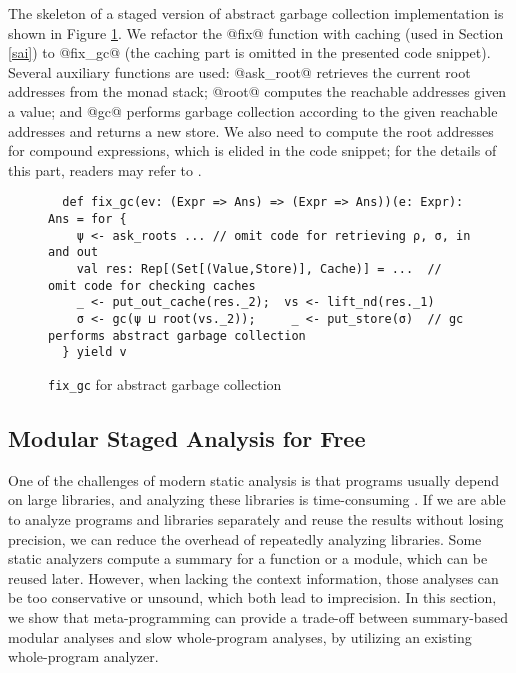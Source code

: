 The skeleton of a staged version of abstract garbage collection implementation
is shown in Figure \ref{fixgc}.
We refactor the @fix@ function with caching (used in Section \ref{sai}) to @fix_gc@
(the caching part is omitted in the presented code snippet). Several auxiliary
functions are used: @ask_root@ retrieves the current root addresses from the
monad stack; @root@ computes the reachable addresses given a value; and @gc@
performs garbage collection according to the given reachable addresses and
returns a new store. We also need to compute the root addresses for compound
expressions, which is elided in the code snippet; for the details of this part,
readers may refer to \cite{DBLP:journals/pacmpl/DaraisLNH17}.

\begin{figure}[h!]
\vspace{-1em}
\begin{lstlisting}
  def fix_gc(ev: (Expr => Ans) => (Expr => Ans))(e: Expr): Ans = for {
    ψ <- ask_roots ... // omit code for retrieving ρ, σ, in and out
    val res: Rep[(Set[(Value,Store)], Cache)] = ...  // omit code for checking caches
    _ <- put_out_cache(res._2);  vs <- lift_nd(res._1)
    σ <- gc(ψ ⊔ root(vs._2));     _ <- put_store(σ)  // gc performs abstract garbage collection
  } yield v
\end{lstlisting}
\vspace{-0.5em}
\caption{\texttt{fix\_gc} for abstract garbage collection} \label{fixgc}
\vspace{-2em}
\end{figure}



\subsection{Modular Staged Analysis for Free} \label{modular}

One of the challenges of modern static analysis is that programs usually depend
on large libraries, and analyzing these libraries is time-consuming
\cite{toman_et_al:LIPIcs:2017:7121}.
If we are able to analyze programs and libraries separately and reuse the
results without losing precision, we can reduce the overhead of repeatedly
analyzing libraries. Some static analyzers compute a summary for a function or
a module, which can be reused later. However, when lacking the context
information, those analyses can be too conservative or unsound, which both lead
to imprecision. In this section, we show that meta-programming can provide a
trade-off between summary-based modular analyses and slow whole-program
analyses, by utilizing an existing whole-program analyzer.

